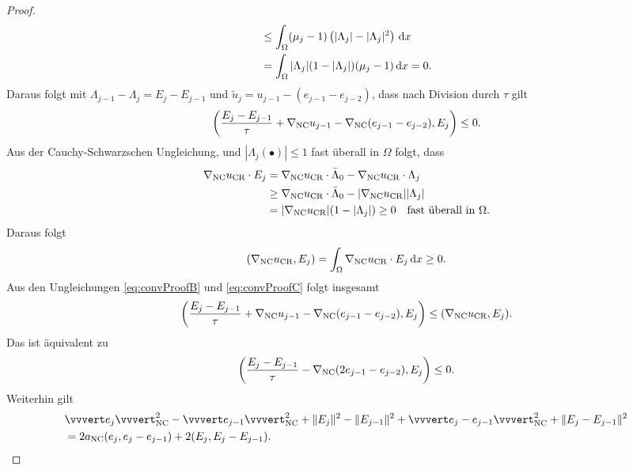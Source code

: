\begin{proof}
\begin{align*}
    &\leq
    \int_\Omega (\mu_j-1)\left(|\Lambda_j|-|\Lambda_j|^2\right)\,\mathrm{d}x\\
    &=
    \int_\Omega |\Lambda_j| (1-|\Lambda_j|)(\mu_j-1)\,\mathrm{d}x 
    =
    0.
  \end{align*}
  Daraus folgt mit $\Lambda_{j-1}-\Lambda_j = E_j-E_{j-1}$ und $\tilde{u}_j =
  u_{j-1}-(e_{j-1}-e_{j-2})$, dass nach Division durch $\tau$ gilt
  \begin{align}
    \label{eq:convProofB}
    \left(\frac{E_j-E_{j-1}}{\tau}+ \nabla_\textup{NC} u_{j-1}-\nabla_\textup{NC}
    (e_{j-1}-e_{j-2}),E_j\right)\leq 0.
  \end{align}
  Aus der Cauchy-Schwarzschen Ungleichung,
   und
  $|\Lambda_j(\bullet)|\leq 1$ fast überall in $\Omega$ folgt, dass
  \begin{align*}
    \nabla_\textup{NC}u_\textup{CR}\cdot E_j 
    &=
    \nabla_\textup{NC}u_\textup{CR}\cdot\bar\Lambda_0 - \nabla_\textup{NC}u_\textup{CR}\cdot\Lambda_j\\
    &\geq 
    \nabla_\textup{NC}u_\textup{CR}\cdot\bar\Lambda_0 - |\nabla_\textup{NC}u_\textup{CR}||\Lambda_j| \\
    &= 
    |\nabla_\textup{NC}u_\textup{CR}|(1-|\Lambda_j|)
    \geq
    0\quad\text{fast überall in }\Omega.
  \end{align*}
  Daraus folgt
  \begin{align}
    \label{eq:convProofC}
    (\nabla_\textup{NC}u_\textup{CR},E_j)=\int_\Omega \nabla_\textup{NC}u_\textup{CR}\cdot E_j\,\mathrm{d}x\geq 0.
  \end{align}
  Aus den Ungleichungen \eqref{eq:convProofB} und \eqref{eq:convProofC} folgt
  insgesamt
  \begin{align*}
    \left( \frac{E_j-E_{j-1}}{\tau}+ \nabla_\textup{NC} u_{j-1}
    -\nabla_{\textup{NC}}(e_{j-1}-e_{j-2}),E_j\right)
    \leq
    (\nabla_\textup{NC}u_\textup{CR},E_j).
  \end{align*}
  Das ist äquivalent zu
  \begin{align}
    \label{eq:convProofD}
    \left( \frac{E_j-E_{j-1}}{\tau} 
    -\nabla_\textup{NC}(2e_{j-1}-e_{j-2}),E_j\right)\leq 0.
  \end{align}
  Weiterhin gilt
  \begin{equation}
    \begin{aligned}
      \label{eq:longVvvertFormula}
      &\vvvert e_j \vvvert^2_\nc   -
      \vvvert e_{j-1}\vvvert_\nc^2 +
      \Vert E_j \Vert^2 - \Vert E_{j-1}\Vert^2 +
      \vvvert e_j-e_{j-1}\vvvert_\nc^2 +
      \Vert E_j - E_{j-1} \Vert^2\\
      &=
      2a_\nc(e_j,e_j-e_{j-1}) + 2(E_j,E_j-E_{j-1}).
    \end{aligned}
  \end{equation}

\end{proof}
